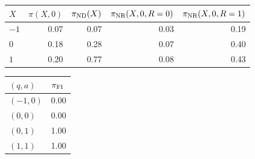 \begin{tabular}{lrrrr}
\toprule
$X$ & $\pi(X,0)$ & $\pi_{\textup{ND}}(X)$ & $\pi_{\textup{NR}}(X,0,R=0)$ & $\pi_{\textup{NR}}(X,0,R=1)$ \\
\midrule
$-1$ & 0.07 & 0.07 & 0.03 & 0.19 \\
$0$ & 0.18 & 0.28 & 0.07 & 0.40 \\
$1$ & 0.20 & 0.77 & 0.08 & 0.43 \\
\bottomrule
\end{tabular}
\vspace{0.6em}
\begin{tabular}{ll}
\toprule
$(q,a)$ & $\pi_{\textup{FI}}$ \\
\midrule
$(-1,0)$ & 0.00 \\
$(0,0)$ & 0.00 \\
$(0,1)$ & 1.00 \\
$(1,1)$ & 1.00 \\
\bottomrule
\end{tabular}
